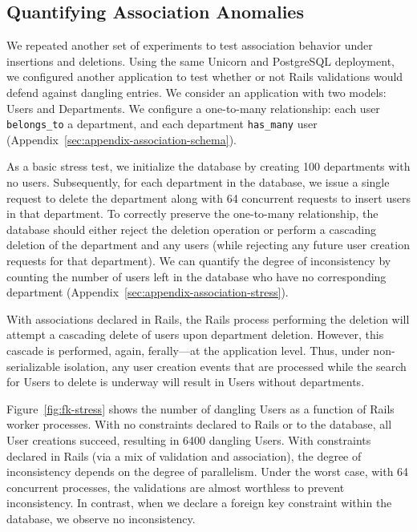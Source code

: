 \subsection{Quantifying Association Anomalies}

We repeated another set of experiments to test association behavior
under insertions and deletions. Using the same Unicorn and PostgreSQL
deployment, we configured another application to test whether or not
Rails validations would defend against dangling entries. We consider
an application with two models: Users and Departments. We configure a
one-to-many relationship: each user \texttt{belongs\_to} a department,
and each department \texttt{has\_many} user
(Appendix~\ref{sec:appendix-association-schema}).

As a basic stress test, we initialize the database by creating 100
departments with no users. Subsequently, for each department in the
database, we issue a single request to delete the department along
with 64 concurrent requests to insert users in that department. To
correctly preserve the one-to-many relationship, the database should
either reject the deletion operation or perform a cascading deletion
of the department and any users (while rejecting any future user
creation requests for that department). We can quantify the degree of
inconsistency by counting the number of users left in the database who
have no corresponding department (Appendix~\ref{sec:appendix-association-stress}).

With associations declared in Rails, the Rails process performing the
deletion will attempt a cascading delete of users upon department
deletion. However, this cascade is performed, again, ferally---at the
application level. Thus, under non-serializable isolation, any user creation
events that are processed while the search for Users to delete is
underway will result in Users without departments.

Figure~\ref{fig:fk-stress} shows the number of dangling Users as a
function of Rails worker processes. With no constraints declared to
Rails or to the database, all User creations succeed, resulting in
6400 dangling Users. With constraints declared in Rails (via a mix of
validation and association), the degree of inconsistency depends on
the degree of parallelism. Under the worst case, with 64 concurrent
processes, the validations are almost worthless to prevent
inconsistency. In contrast, when we declare a foreign key constraint
within the database, we observe no inconsistency.

